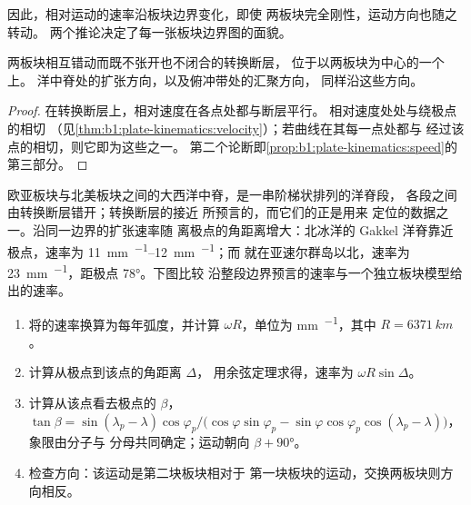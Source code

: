 因此，相对运动的速率沿板块边界变化，即使
两板块完全刚性，运动方向也随之转动。
两个推论决定了每一张板块边界图的面貌。

\begin{proposition}[转换断层沿小圆分布]\label{prop:b1:plate-kinematics:transforms}
两板块相互错动而既不张开也不闭合的转换断层，
位于以两板块为中心的一个上。
洋中脊处的扩张方向，以及俯冲带处的汇聚方向，
同样沿这些方向。
\end{proposition}

\begin{proof}
在转换断层上，相对速度在各点处都与断层平行。
相对速度处处与绕极点的相切
（见\cref{thm:b1:plate-kinematics:velocity}）；若曲线在其每一点处都与
经过该点的相切，则它即为这些之一。
第二个论断即\cref{prop:b1:plate-kinematics:speed}的第三部分。
\end{proof}

欧亚板块与北美板块之间的大西洋中脊，是一串阶梯状排列的洋脊段，
各段之间由转换断层错开；转换断层的接近
所预言的，而它们的正是用来
定位的数据之一。沿同一边界的扩张速率随
离极点的角距离增大：北冰洋的 Gakkel
洋脊靠近极点，速率为 \qtyrange{11}{12}{mm.^{-1}}；而
就在亚速尔群岛以北，速率为 \qty{23}{mm.^{-1}}，距极点 \ang{78}。下图比较
沿整段边界预言的速率与一个独立板块模型给出的速率。

\begin{method}[某点处的速度]\label{met:b1:plate-kinematics:velocity}
\begin{enumerate}
  \item 将的速率换算为每年弧度，并计算
        $\omega R$，单位为 \unit{mm.^{-1}}，其中 $R = \qty{6371}{km}$。
  \item 计算从极点到该点的角距离 $\Delta$，
        用余弦定理求得，速率为 $\omega R\sin\Delta$。
  \item 计算从该点看去极点的 $\beta$，
        $\tan\beta = \sin(\lambda_p - \lambda)\cos\varphi_p /
        \bigl(\cos\varphi\sin\varphi_p - \sin\varphi\cos\varphi_p
        \cos(\lambda_p - \lambda)\bigr)$，象限由分子与
        分母共同确定；运动朝向 $\beta + \ang{90}$。
  \item 检查方向：该运动是第二块板块相对于
        第一块板块的运动，交换两板块则方向相反。
\end{enumerate}
\end{method}

